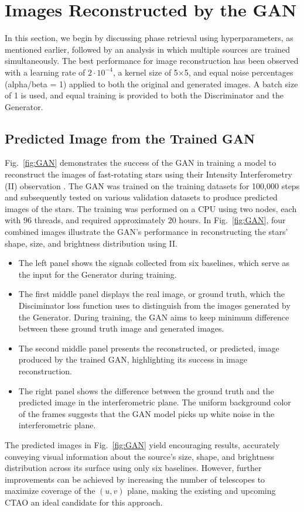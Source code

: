 \section{Images Reconstructed by the GAN}
In this section, we begin by discussing phase retrieval using hyperparameters, as mentioned earlier, followed by an analysis in which multiple sources are trained simultaneously. The best performance for image reconstruction has been observed with a learning rate of \(2 \cdot 10^{-4}\), a kernel size of 5×5, and equal noise percentages (alpha/beta = 1) applied to both the original and generated images. A batch size of 1 is used, and equal training is provided to both the Discriminator and the Generator.

\subsection{Predicted Image from the Trained GAN}
Fig.~\ref{fig:GAN} demonstrates the success of the GAN in training a model to reconstruct the images of  fast-rotating stars using their Intensity Interferometry (II) observation . The GAN was trained on the training datasets for 100,000 steps and subsequently tested on various validation datasets to produce predicted images of the stars. The training was performed on a CPU using two nodes, each with 96 threads, and required approximately 20 hours. In Fig.~\ref{fig:GAN}, four combined images illustrate the GAN's performance in reconstructing the stars' shape, size, and brightness distribution using II.
\begin{itemize}
\item{The left panel shows the signals collected from six baselines, which serve as the input for the Generator during training.}
\item{The first middle panel displays the real image, or ground truth, which the Disciminator loss function uses to distinguish from the images generated by the Generator. During training, the GAN aims to keep minimum difference between these ground truth image and generated images.}
\item{The second middle panel presents the reconstructed, or predicted, image produced by the trained GAN, highlighting its success in image reconstruction.}
\item{The right panel shows the difference between the ground truth and the predicted image in the interferometric plane. The uniform background color of the frames suggests that the GAN model picks up white noise in the interferometric plane.}
\end{itemize}
The predicted images in Fig.~\ref{fig:GAN} yield encouraging results, accurately conveying visual information about the source's size, shape, and brightness distribution across its surface using only six baselines. However, further improvements can be achieved by increasing the number of telescopes to maximize coverage of the $(u, v)$ plane, making the existing and upcoming CTAO an ideal candidate for this approach.

